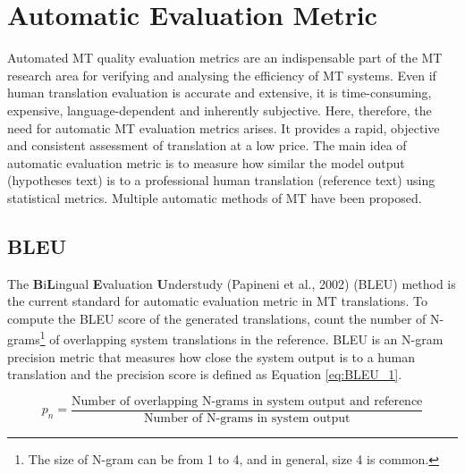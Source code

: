 \section{Automatic Evaluation Metric}
Automated MT quality evaluation metrics are an indispensable part of the MT research area for verifying and analysing the efficiency of MT systems. Even if human translation evaluation is accurate and extensive, it is time-consuming, expensive, language-dependent and inherently subjective. Here, therefore, the need for automatic MT evaluation metrics arises. It provides a rapid, objective and consistent assessment of translation at a low price. The main idea of automatic evaluation metric is to measure how similar the model output (hypotheses text) is to a professional human translation (reference text) using statistical metrics. Multiple automatic methods of MT have been proposed.

\subsection{BLEU}\label{section:evaluation_metrics}

The \textbf{B}i\textbf{L}ingual \textbf{E}valuation \textbf{U}nderstudy (Papineni et al., 2002) (BLEU) method is the current standard for automatic evaluation metric in MT translations. To compute the BLEU score of the generated translations, count the number of N-grams\footnote{The size of N-gram can be from 1 to 4, and in general, size 4 is common. } of overlapping system translations in the reference. BLEU is an N-gram precision metric that measures how close the system output is to a human translation and the precision score is defined as Equation \ref{eq:BLEU_1}.

\begin{equation}
    p_n = \frac{\text{Number of overlapping N-grams in system output and reference}}{\text{Number of N-grams in system output}}
    \label{eq:BLEU_1}
\end{equation}

